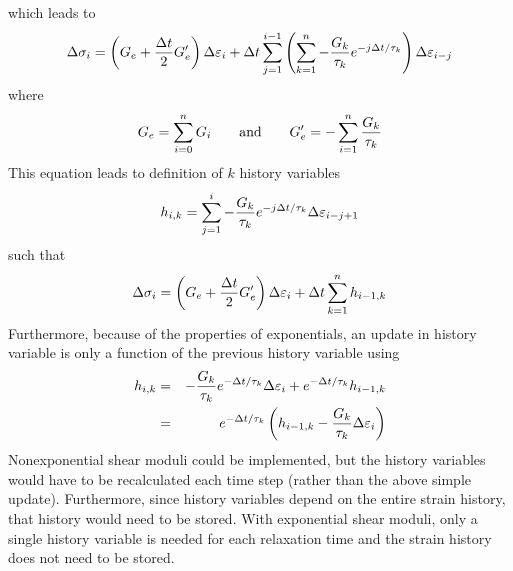 \documentclass[11pt]{article}
\def\e#1{\varepsilon_{#1}}
\def\s#1{\sigma_{#1}}
\begin{document}
which leads to
\begin{equation}
    \Delta \s{i} = \left(G_e + {\Delta t\over 2}G_e'\right)\Delta \e{i} 
                          + \Delta t \sum_{j=1}^{i-1}
                            \left(\sum_{k=1}^n -{G_k\over\tau_k} e^{-j\Delta t/\tau_k}\right)\Delta \e{i-j}
\end{equation}
where
\begin{equation}
            G_e = \sum_{i=0}^n G_i     \qquad {\rm and} \qquad     G_e' = -\sum_{i=1}^n {G_k\over\tau_k}
\end{equation}
This equation leads to definition of $k$ history variables
\begin{equation}
      h_{i,k} = \sum_{j=1}^{i}  -{G_k\over\tau_k} e^{-j\Delta t/\tau_k}\Delta \e{i-j+1}
\end{equation}
such that
\begin{equation}
    \Delta \s{i} = \left(G_e + {\Delta t\over 2}G_e'\right)\Delta \e{i} 
                          + \Delta t  \sum_{k=1}^n h_{i-1,k}
\end{equation}
Furthermore, because of the properties of exponentials, an update in history variable is only a function of the previous history variable using
\begin{eqnarray}
        h_{i,k} & = & -{G_k\over\tau_k} e^{-\Delta t/\tau_k}\Delta \e{i} + e^{-\Delta t/\tau_k}h_{i-1,k}  \\
           & = & e^{-\Delta t/\tau_k}\left(h_{i-1,k} - {G_k\over\tau_k}\Delta \e{i}\right)
\end{eqnarray}
Nonexponential shear moduli could be implemented, but the history variables would have to be recalculated each time step (rather than the above simple update). Furthermore, since history variables depend on the entire strain history, that history would need to be stored. With exponential shear moduli, only a single history variable is needed for each relaxation time and the strain history does not need to be stored.
\end{document}
